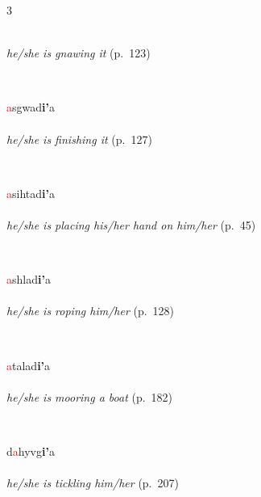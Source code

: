 \documentclass[oneside,openany]{book}%
\begin{document}
\begin{multicols}{3}
\begin{minipage}[t]{\linewidth}
\\
\noindent \textit{he/she is gnawing it} (p.~123)
\end{minipage}\\[1em]%
\begin{minipage}[t]{\linewidth}
\raggedright\noindent \textcolor{Red}{a}sgwad\textbf{i'}a\\
\\
\noindent \textit{he/she is finishing it} (p.~127)
\end{minipage}\\[1em]%
\begin{minipage}[t]{\linewidth}
\raggedright\noindent \textcolor{Red}{a}sihtad\textbf{i'}a\\
\\
\noindent \textit{he/she is placing his/her hand on him/her} (p.~45)
\end{minipage}\\[1em]%
\begin{minipage}[t]{\linewidth}
\raggedright\noindent \textcolor{Red}{a}shlad\textbf{i'}a\\
\\
\noindent \textit{he/she is roping him/her} (p.~128)
\end{minipage}\\[1em]%
\begin{minipage}[t]{\linewidth}
\raggedright\noindent \textcolor{Red}{a}talad\textbf{i'}a\\
\\
\noindent \textit{he/she is mooring a boat} (p.~182)
\end{minipage}\\[1em]%
\begin{minipage}[t]{\linewidth}
\raggedright\noindent d\textcolor{Red}{a}hyvg\textbf{i'}a\\
\\
\noindent \textit{he/she is tickling him/her} (p.~207)
\end{minipage}\\[1em]%
\begin{minipage}[t]{\linewidth}

\end{minipage}
\end{multicols}
\end{document}
